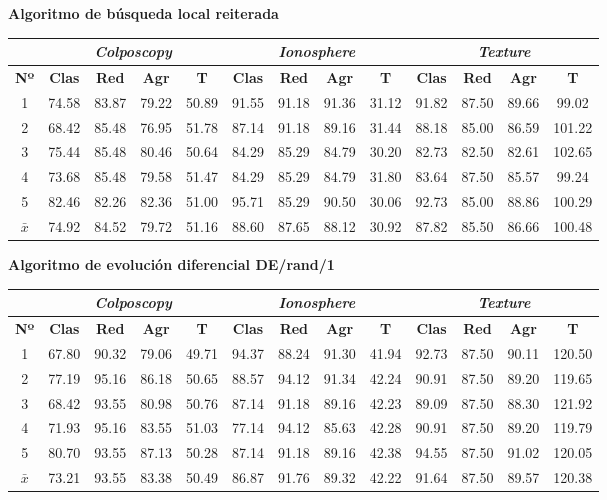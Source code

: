 \documentclass[12pt]{article}
\begin{document}
\newpage
\textbf{Algoritmo de búsqueda local reiterada}

\begin{table}[ht!]
\begin{tabular}{ccccc|cccc|cccc}
\centering
 & \multicolumn{4}{c}{\textit{Colposcopy}} & \multicolumn{4}{c}{\textit{Ionosphere}} & \multicolumn{4}{c}{\textit{Texture}} \\ \hline
\textbf{Nº} & \textbf{Clas} & \textbf{Red} & \textbf{Agr} & \textbf{T} & \textbf{Clas} & \textbf{Red} & \textbf{Agr} & \textbf{T} & \textbf{Clas} & \textbf{Red} & \textbf{Agr} & \textbf{T} \\ \hline
1 & 74.58 & 83.87 & 79.22 & 50.89 & 91.55 & 91.18 & 91.36 & 31.12 & 91.82 & 87.50 & 89.66 & 99.02\\
2 & 68.42 & 85.48 & 76.95 & 51.78 & 87.14 & 91.18 & 89.16 & 31.44 & 88.18 & 85.00 & 86.59 & 101.22\\
3 & 75.44 & 85.48 & 80.46 & 50.64 & 84.29 & 85.29 & 84.79 & 30.20 & 82.73 & 82.50 & 82.61 & 102.65\\
4 & 73.68 & 85.48 & 79.58 & 51.47 & 84.29 & 85.29 & 84.79 & 31.80 & 83.64 & 87.50 & 85.57 & 99.24\\
5 & 82.46 & 82.26 & 82.36 & 51.00 & 95.71 & 85.29 & 90.50 & 30.06 & 92.73 & 85.00 & 88.86 & 100.29\\
\hline 
$\bar{x}$  & 74.92 & 84.52 & 79.72 & 51.16  & 88.60 & 87.65 & 88.12 & 30.92  & 87.82 & 85.50 & 86.66 & 100.48
\end{tabular}
\end{table}

\textbf{Algoritmo de evolución diferencial DE/rand/1}

\begin{table}[ht!]
\begin{tabular}{ccccc|cccc|cccc}
\centering
 & \multicolumn{4}{c}{\textit{Colposcopy}} & \multicolumn{4}{c}{\textit{Ionosphere}} & \multicolumn{4}{c}{\textit{Texture}} \\ \hline
\textbf{Nº} & \textbf{Clas} & \textbf{Red} & \textbf{Agr} & \textbf{T} & \textbf{Clas} & \textbf{Red} & \textbf{Agr} & \textbf{T} & \textbf{Clas} & \textbf{Red} & \textbf{Agr} & \textbf{T} \\ \hline
1 & 67.80 & 90.32 & 79.06 & 49.71 & 94.37 & 88.24 & 91.30 & 41.94 & 92.73 & 87.50 & 90.11 & 120.50\\
2 & 77.19 & 95.16 & 86.18 & 50.65 & 88.57 & 94.12 & 91.34 & 42.24 & 90.91 & 87.50 & 89.20 & 119.65\\
3 & 68.42 & 93.55 & 80.98 & 50.76 & 87.14 & 91.18 & 89.16 & 42.23 & 89.09 & 87.50 & 88.30 & 121.92\\
4 & 71.93 & 95.16 & 83.55 & 51.03 & 77.14 & 94.12 & 85.63 & 42.28 & 90.91 & 87.50 & 89.20 & 119.79\\
5 & 80.70 & 93.55 & 87.13 & 50.28 & 87.14 & 91.18 & 89.16 & 42.38 & 94.55 & 87.50 & 91.02 & 120.05\\
\hline 
$\bar{x}$ & 73.21 & 93.55 & 83.38 & 50.49 & 86.87 & 91.76 & 89.32 & 42.22 & 91.64 & 87.50 & 89.57 & 120.38
\end{tabular}
\end{table}
\end{document}
